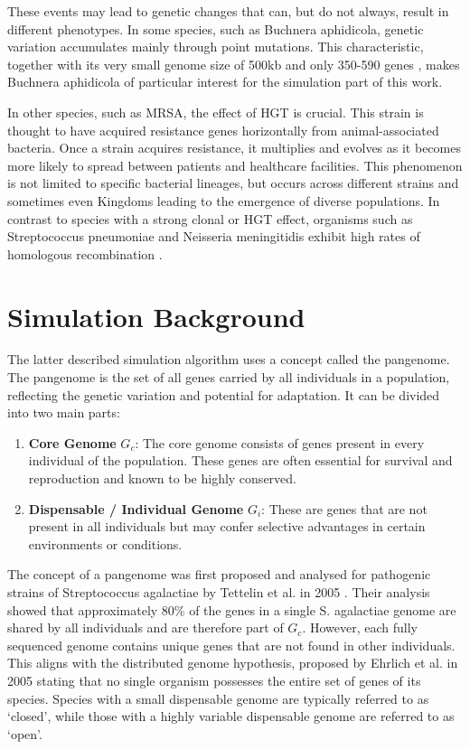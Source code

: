 These events may lead to genetic changes that can, but do not always, result in different phenotypes.
In some species, such as Buchnera aphidicola, genetic variation accumulates mainly through point mutations.
This characteristic, together with its very small genome size of 500kb and only 350-590 genes \cite{Buchnera},
makes Buchnera aphidicola of particular interest for the simulation part of this work.

In other species, such as \ac{MRSA}, the effect of \ac{HGT} is crucial.
This strain is thought to have acquired resistance genes horizontally from animal-associated bacteria.
Once a strain acquires resistance, it multiplies and evolves as it becomes more likely to spread between patients and healthcare facilities.
This phenomenon is not limited to specific bacterial lineages, but occurs across different strains and sometimes even Kingdoms \cite{HGT_Kingdom_Richards_2011} leading to the emergence of diverse populations.
In contrast to species with a strong clonal or \ac{HGT} effect, organisms such as Streptococcus pneumoniae and Neisseria meningitidis exhibit high rates of homologous recombination \cite{Panstripe_Tonkin_Hill_2023} \cite{HGT_Burmeister_2015}.

\section{Simulation Background}\label{sec:simulation-background}
The latter described simulation algorithm uses a concept called the pangenome.
The pangenome is the set of all genes carried by all individuals in a population, reflecting the genetic variation and potential for adaptation.
It can be divided into two main parts:

\begin{enumerate}
      \item \textbf{Core Genome} $G_c$: The core genome consists of genes present in every individual of the population.
            These genes are often essential for survival and reproduction and known to be highly conserved.
      \item \textbf{Dispensable / Individual Genome} $G_i$: These are genes that are not present in all individuals but may confer selective advantages in certain environments or conditions.
\end{enumerate}

The concept of a pangenome was first proposed and analysed for pathogenic strains of Streptococcus agalactiae by Tettelin et al. in 2005 \cite{Tettelin_2005}.
Their analysis showed that approximately 80\% of the genes in a single S. agalactiae genome are shared by all individuals and are therefore part of $G_c$.
However, each fully sequenced genome contains unique genes that are not found in other individuals.
This aligns with  the distributed genome hypothesis, proposed by Ehrlich et al.
in 2005 \cite{Ehrlich_2010} stating that no single organism possesses the entire set of genes of its species.
Species with a small dispensable genome are typically referred to as `closed', while those with a highly variable dispensable genome are referred to as `open'.

